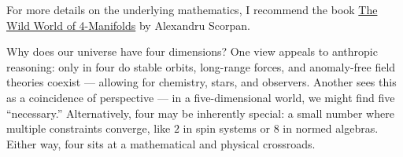 For more details on the underlying mathematics, I recommend the book \href{https://bookstore.ams.org/FOURMAN}{The Wild World of 4-Manifolds} by Alexandru Scorpan.

\begin{commentary}
Why does our universe have four dimensions? One view appeals to anthropic reasoning: only in four do stable orbits, long-range forces, and anomaly-free field theories coexist — allowing for chemistry, stars, and observers. Another sees this as a coincidence of perspective — in a five-dimensional world, we might find five “necessary.” Alternatively, four may be inherently special: a small number where multiple constraints converge, like $2$ in spin systems or $8$ in normed algebras. Either way, four sits at a mathematical and physical crossroads.
\end{commentary}

